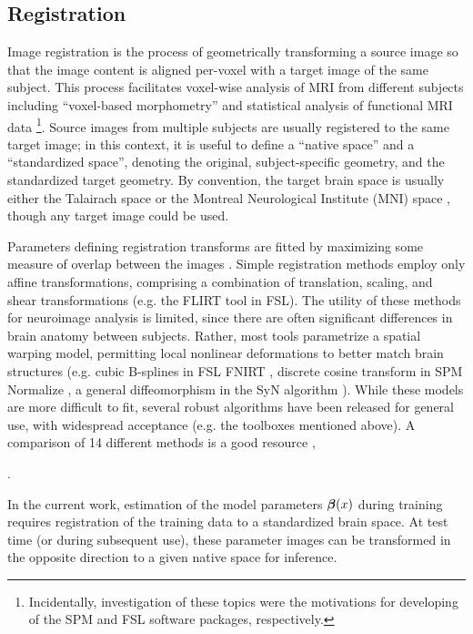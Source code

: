 \subsection{Registration}\label{ss:meth-reg}
Image registration is the process of geometrically transforming a source image so that the image content is aligned per-voxel with a target image of the same subject.
This process facilitates voxel-wise analysis of MRI from different subjects including  ``voxel-based morphometry'' \cite{Ashburner2000a} and statistical analysis of functional MRI data \cite{Smith2004}%
\footnote{Incidentally, investigation of these topics were the motivations for developing of the SPM and FSL software packages, respectively.}.
Source images from multiple subjects are usually registered to the same target image; 
in this context, it is useful to define a ``native space'' and a ``standardized space'', denoting the original, subject-specific geometry, and the standardized target geometry.
By convention, the target brain space is usually either the Talairach space \cite{Talairach1988} or the Montreal Neurological Institute (MNI) space \cite{Evans1993}, though any target image could be used.
\par
Parameters defining registration transforms are fitted by maximizing some measure of overlap between the images \cite{Sotiras2013}.
Simple registration methods employ only affine transformations, comprising a combination of translation, scaling, and shear transformations (e.g. the FLIRT tool \cite{Jenkinson2002} in FSL).
The utility of these methods for neuroimage analysis is limited, since there are often significant differences in brain anatomy between subjects.
Rather, most tools parametrize a spatial warping model, permitting local nonlinear deformations to better match brain structures (e.g.
cubic B-splines in FSL FNIRT \cite{Andersson2007},
discrete cosine transform in SPM Normalize \cite{Ashburner1997,Ashburner2005},
a general diffeomorphism in the SyN algorithm \cite{Avants2008}).
While these models are more difficult to fit, several robust algorithms have been released for general use, with widespread acceptance (e.g. the toolboxes mentioned above).
A \citeyear{Klein2009} comparison of 14 different methods is a good resource \cite{Klein2009},

\cite{Kazemi2014}.
\par
In the current work, estimation of the model parameters $\bm{\beta}(x)$ during training requires registration of the training data to a standardized brain space.
At test time (or during subsequent use), these parameter images can be transformed in the opposite direction to a given native space for inference.



